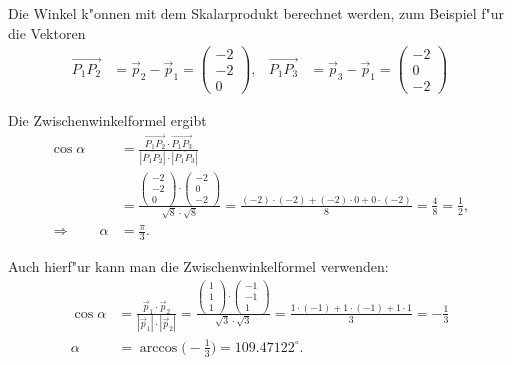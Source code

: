 \begin{loesung}
Die Winkel k"onnen mit dem Skalarprodukt berechnet werden, zum
Beispiel f"ur die Vektoren
\begin{align*}
\overrightarrow{P_1P_2}&=\vec p_2-\vec p_1=\begin{pmatrix}-2\\-2\\ 0\end{pmatrix},&
\overrightarrow{P_1P_3}&=\vec p_3-\vec p_1=\begin{pmatrix}-2\\ 0\\-2\end{pmatrix}
\end{align*}
\begin{teilaufgaben}
\item
Die Zwischenwinkelformel ergibt
\begin{align*}
\cos\alpha
&=
\frac{\overrightarrow{P_1P_2}\cdot\overrightarrow{P_1P_3}}{
|\overline{P_1P_2}|\cdot |\overline{P_1P_3}|
}
\\
&=
\frac{
\begin{pmatrix}-2\\-2\\ 0\end{pmatrix}\cdot
\begin{pmatrix}-2\\ 0\\-2\end{pmatrix}
}{
\sqrt{8}\cdot\sqrt{8}
}
=\frac{(-2)\cdot(-2)+(-2)\cdot 0+0\cdot(-2)}{8}
=\frac{4}{8}=\frac12,\\
\Rightarrow\qquad\alpha&=\frac{\pi}3.
\end{align*}
\item
Auch hierf"ur kann man die Zwischenwinkelformel verwenden:
\begin{align*}
\cos\alpha&=
\frac{\vec p_1\cdot\vec p_2}{|\vec p_1|\cdot |\vec p_2|}
=
\frac{\begin{pmatrix}1\\1\\1\end{pmatrix}\cdot\begin{pmatrix}-1\\-1\\1\end{pmatrix}}{\sqrt{3}\cdot\sqrt{3}}
=
\frac{1\cdot(-1)+1\cdot(-1)+1\cdot 1}{3}=-\frac13
\\
\alpha&=\arccos\biggl(-\frac13\biggr)= 109.47122^\circ.
\end{align*}

\end{teilaufgaben}
\end{loesung}

